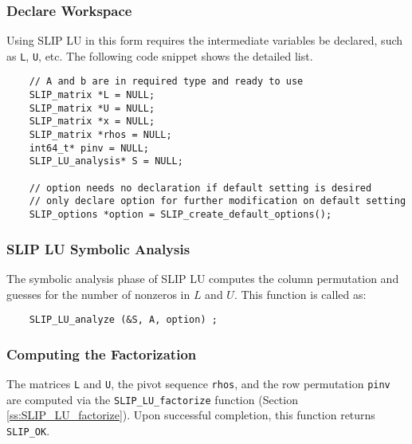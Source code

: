 \documentclass[12pt]{article}
\theoremstyle{definition}
\begin{document}
\subsubsection{Declare Workspace}

Using SLIP LU in this form requires the intermediate variables be declared,
such as \verb|L|, \verb|U|, etc. The following code snippet shows the
detailed list.

{\small
\begin{verbatim}
    // A and b are in required type and ready to use
    SLIP_matrix *L = NULL;
    SLIP_matrix *U = NULL;
    SLIP_matrix *x = NULL;
    SLIP_matrix *rhos = NULL;
    int64_t* pinv = NULL;
    SLIP_LU_analysis* S = NULL;

    // option needs no declaration if default setting is desired
    // only declare option for further modification on default setting
    SLIP_options *option = SLIP_create_default_options();
     \end{verbatim} }

\subsubsection{SLIP LU Symbolic Analysis}

The symbolic analysis phase of SLIP LU computes the column permutation and
guesses for the number of nonzeros in $L$ and $U$. This function is called as:

{\small
    \begin{verbatim}
    SLIP_LU_analyze (&S, A, option) ; \end{verbatim} }


\subsubsection{Computing the Factorization}

The matrices \verb|L| and \verb|U|, the pivot sequence \verb|rhos|, and the row
permutation \verb|pinv| are computed via the \verb|SLIP_LU_factorize| function
(Section \ref{ss:SLIP_LU_factorize}).  Upon successful completion, this
function returns \verb|SLIP_OK|.
\end{document}
